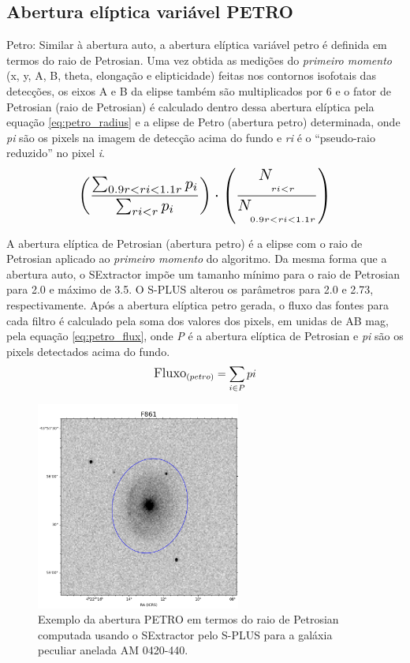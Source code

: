 \subsection{Abertura elíptica variável PETRO}
Petro: Similar à abertura auto, a abertura elíptica variável petro é definida em termos do raio de Petrosian\cite{1976ApJ...209L...1P}. Uma vez obtida as medições do \emph{primeiro momento} (x, y, A, B, theta, elongação e elipticidade) feitas nos contornos isofotais das detecções, os eixos A e B da elipse também são multiplicados por 6 e o fator de Petrosian (raio de Petrosian) é calculado dentro dessa abertura elíptica pela equação \ref{eq:petro_radius} e a elipse de Petro (abertura petro) determinada, onde \emph{pi} são os pixels na imagem de detecção acima do fundo e \emph{ri} é o ``pseudo-raio reduzido'' no pixel \emph{i}.
\begin{equation} \label{eq:petro_radius}
\scalebox{1.4}{$\displaystyle \left(\frac{\sum_{0.9r<ri<1.1r} p_i}{\sum_{ri<r} p_i}\right) \cdot \left(\frac{N_{\underset{ri<r}{\ }}}{N_{\underset{0.9r<ri<1.1r}{\ }}}\right)$}
\end{equation}

A abertura elíptica de Petrosian (abertura petro) é a elipse com o raio de Petrosian aplicado ao \emph{primeiro momento} do algoritmo. Da mesma forma que a abertura auto, o SExtractor impõe um tamanho mínimo para o raio de Petrosian para 2.0 e máximo de 3.5. O S-PLUS alterou os parâmetros para 2.0 e 2.73, respectivamente. Após a abertura elíptica petro gerada, o fluxo das fontes para cada filtro é calculado pela soma dos valores dos pixels, em unidas de AB mag, pela equação \ref{eq:petro_flux}, onde \emph{P} é a abertura elíptica de Petrosian e \emph{pi} são os pixels detectados acima do fundo. 
\begin{equation} \label{eq:petro_flux}
\large
\text{Fluxo}_{(petro)} = \sum_{i \in P} pi
\end{equation}

\begin{figure}[h]
  \centering 
  \includegraphics[width=0.6\textwidth]{Imagens/petro_exemplo.PNG} 
  \caption[Exemplo da abertura PETRO para a galáxia AM 0420-440.]{Exemplo da abertura PETRO em termos do raio de Petrosian computada usando o SExtractor pelo S-PLUS para a galáxia peculiar anelada AM 0420-440.}
  \label{fig:petro_exemplo} 
\end{figure}


